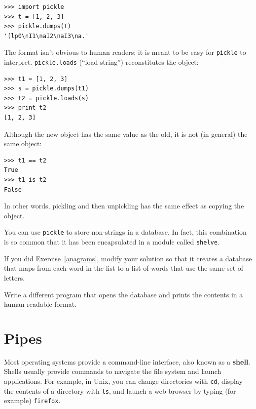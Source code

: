 \documentclass[10pt]{book}
\begin{document}
{\beforeverb
\begin{verbatim}
>>> import pickle
>>> t = [1, 2, 3]
>>> pickle.dumps(t)
'(lp0\nI1\naI2\naI3\na.'
\end{verbatim}
\afterverb
%
The format isn't obvious to human readers; it is meant to be
easy for {\tt pickle} to interpret.  {\tt pickle.loads}
(``load string'') reconstitutes the object:

\beforeverb
\begin{verbatim}
>>> t1 = [1, 2, 3]
>>> s = pickle.dumps(t1)
>>> t2 = pickle.loads(s)
>>> print t2
[1, 2, 3]
\end{verbatim}
\afterverb
%
Although the new object has the same value as the old, it is
not (in general) the same object:

\beforeverb
\begin{verbatim}
>>> t1 == t2
True
>>> t1 is t2
False
\end{verbatim}
\afterverb
%
In other words, pickling and then unpickling has the same effect
as copying the object.

You can use {\tt pickle} to store non-strings in a database.
In fact, this combination is so common that it has been
encapsulated in a module called {\tt shelve}.  



\begin{ex}


If you did Exercise~\ref{anagrams}, modify your solution so that
it creates a database that maps from each word in the list to
a list of words that use the same set of letters.

Write a different program that opens the database and prints
the contents in a human-readable format.
\end{ex}


\section{Pipes}


Most operating systems provide a command-line interface,
also known as a {\bf shell}.  Shells usually provide commands
to navigate the file system and launch applications.  For
example, in Unix, you can change directories with {\tt cd},
display the contents of a directory with {\tt ls}, and launch
a web browser by typing (for example) {\tt firefox}.

}
\end{document}
